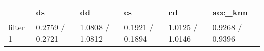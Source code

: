 \begin{tabular}{llllll}
\toprule
{} &               ds &               dd &               cs &               cd &          acc\_knn \\
\midrule
filter 1 &  0.2759 / 0.2721 &  1.0808 / 1.0812 &  0.1921 / 0.1894 &  1.0125 / 1.0146 &  0.9268 / 0.9396 \\
\bottomrule
\end{tabular}
